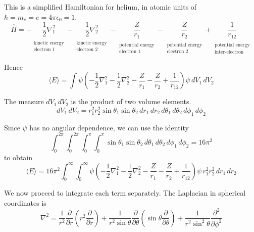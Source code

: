 \documentclass[12pt]{article}
\begin{document}
This is a simplified Hamiltonian for helium, in atomic units of $\hbar=m_e=e=4\pi\epsilon_0=1$.
\begin{equation*}
\hat{H}=
-\underset{\substack{\\[1ex]\text{kinetic energy}\\\text{electron 1}}}{\frac{1}{2}\nabla^2_1}
-\underset{\substack{\\[1ex]\text{kinetic energy}\\\text{electron 2}}}{\frac{1}{2}\nabla^2_2}
-\underset{\substack{\\[1ex]\text{potential energy}\\\text{electron 1}}}{\frac{Z}{r_1}}
-\underset{\substack{\\[1ex]\text{potential energy}\\\text{electron 2}}}{\frac{Z}{r_2}}
+\underset{\substack{\\[1ex]\text{potential energy}\\\text{inter-electron}}}{\frac{1}{r_{12}}}
\end{equation*}

Hence
\begin{equation*}
\langle E\rangle=
\int\psi\left(
-\frac{1}{2}\nabla^2_1
-\frac{1}{2}\nabla^2_2
-\frac{Z}{r_1}
-\frac{Z}{r_2}
+\frac{1}{r_{12}}
\right)\psi\,dV_1\,dV_2
\end{equation*}

The measure $dV_1\,dV_2$ is the product of two volume elements.
\begin{equation*}
dV_1\,dV_2=r_1^2 r_2^2 \sin\theta_1 \sin\theta_2
\,dr_1\,dr_2\,d\theta_1\,d\theta_2\,d\phi_1\,d\phi_2
\end{equation*}

Since $\psi$ has no angular dependence, we can use the identity
\begin{equation*}
\int_0^{2\pi}\int_0^{2\pi}\int_0^\pi\int_0^\pi\sin\theta_1\sin\theta_2
\,d\theta_1\,d\theta_2\,d\phi_1\,d\phi_2=16\pi^2
\tag{1}
\end{equation*}
to obtain
\begin{equation*}
\langle E\rangle=16\pi^2\int_0^\infty\int_0^\infty
\psi\left(
-\frac{1}{2}\nabla^2_1
-\frac{1}{2}\nabla^2_2
-\frac{Z}{r_1}
-\frac{Z}{r_2}
+\frac{1}{r_{12}}
\right)\psi
\,r_1^2 r_2^2
\,dr_1\,dr_2
\end{equation*}

We now proceed to integrate each term separately.
The Laplacian in spherical coordinates is
\begin{equation*}
\nabla^2=\frac{1}{r^2}\frac{\partial}{\partial r}
\left(r^2\frac{\partial}{\partial r}\right)
+
\frac{1}{r^2\sin\theta}\frac{\partial}{\partial\theta}
\left(\sin\theta\frac{\partial}{\partial\theta}\right)
+
\frac{1}{r^2\sin^2\theta}\frac{\partial^2}{\partial\phi^2}
\end{equation*}
\end{document}
